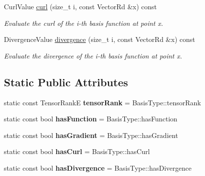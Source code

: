 \begin{DoxyCompactItemize}
Curl\+Value \hyperlink{classHArDCore2D_1_1RestrictedBasis_a81e5a6c78223c5fe9a1e05d47a7798f1}{curl} (size\+\_\+t i, const Vector\+Rd \&x) const
\begin{DoxyCompactList}\small\item\em Evaluate the curl of the i-\/th basis function at point x. \end{DoxyCompactList}\item 
\mbox{\label{classHArDCore2D_1_1RestrictedBasis_aa273301688a05d4f7e38cda0d1277212}} 
Divergence\+Value \hyperlink{classHArDCore2D_1_1RestrictedBasis_aa273301688a05d4f7e38cda0d1277212}{divergence} (size\+\_\+t i, const Vector\+Rd \&x) const
\begin{DoxyCompactList}\small\item\em Evaluate the divergence of the i-\/th basis function at point x. \end{DoxyCompactList}\end{DoxyCompactItemize}
\subsection*{Static Public Attributes}
\begin{DoxyCompactItemize}
\item 
\mbox{\label{classHArDCore2D_1_1RestrictedBasis_a7ac0d24bac4b90d8f97562a6f7aa5de5}} 
static const Tensor\+RankE {\bfseries tensor\+Rank} = Basis\+Type\+::tensor\+Rank
\item 
\mbox{\label{classHArDCore2D_1_1RestrictedBasis_ace08c56ba0963f5148c3ae82bc820453}} 
static const bool {\bfseries has\+Function} = Basis\+Type\+::has\+Function
\item 
\mbox{\label{classHArDCore2D_1_1RestrictedBasis_a61cf97a1a52871887797bb46c15f0ba4}} 
static const bool {\bfseries has\+Gradient} = Basis\+Type\+::has\+Gradient
\item 
\mbox{\label{classHArDCore2D_1_1RestrictedBasis_a929c9098450f73e3f7f5a315ac23b1fe}} 
static const bool {\bfseries has\+Curl} = Basis\+Type\+::has\+Curl
\item 
\mbox{\label{classHArDCore2D_1_1RestrictedBasis_a0c2322e7e67b5ca1f562db511b1e6154}} 
static const bool {\bfseries has\+Divergence} = Basis\+Type\+::has\+Divergence
\end{DoxyCompactItemize}


